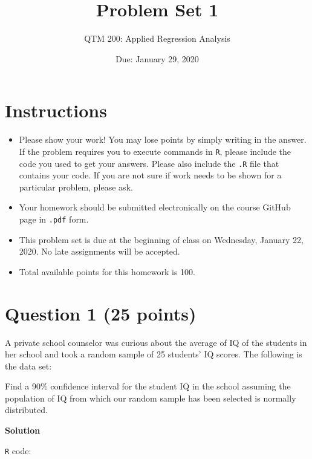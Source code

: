 \documentclass[12pt,letterpaper]{article}
\title{Problem Set 1}
\date{Due: January 29, 2020}
\author{QTM 200: Applied Regression Analysis}
\begin{document}
	\maketitle
	
	\section*{Instructions}
	\begin{itemize}
		\item Please show your work! You may lose points by simply writing in the answer. If the problem requires you to execute commands in \texttt{R}, please include the code you used to get your answers. Please also include the \texttt{.R} file that contains your code. If you are not sure if work needs to be shown for a particular problem, please ask.
		\item Your homework should be submitted electronically on the course GitHub page in \texttt{.pdf} form.
		\item This problem set is due at the beginning of class on Wednesday, January 22, 2020. No late assignments will be accepted.
		\item Total available points for this homework is 100.
	\end{itemize}
	
	\vspace{1cm}
	\section*{Question 1 (25 points)}
	
	A private school counselor was curious about the average of IQ of the students in her school and took a random sample of 25 students' IQ scores. The following is the data set:
	\vspace{.5cm}
	
	  
	
	\vspace{.5cm}
	
	\noindent Find a 90\% confidence interval for the student IQ in the school assuming the population of IQ from which our random sample has been selected is normally distributed. 
	\vspace{.25cm}
	
	\noindent\textbf{Solution}
	
	\texttt {R} code:
	
	
	
\end{document}

